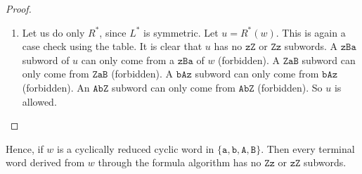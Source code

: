 \documentclass{article}
\makeatletter
\newcommand{\@addresses}{}
\newcommand{\printaddresses}{%
	\section*{}
	\@addresses
}
\makeatother
\begin{document}
\begin{proof}
\begin{enumerate}
			
			\item Let us do only $R^*$, since $L^*$ is symmetric.
			Let $u=R^*(w)$.
			This is again a case check using the table.
			It is clear that $u$ has no $\mathtt{zZ}$ or $\mathtt{Z z}$ subwords.
			A $\mathtt{zB a}$ subword of $u$ can only come from a $\mathtt{zB a}$ of $w$ (forbidden).
			A $\mathtt{Z aB}$ subword can only come from $\mathtt{Z aB}$ (forbidden).
			A $\mathtt{bA z}$ subword can only come from $\mathtt{bA z}$ (forbidden).
			An $\mathtt{A bZ}$ subword can only come from $\mathtt{A bZ}$ (forbidden).
			So $u$ is allowed. \qedhere
		\end{enumerate}
	\end{proof}
	
	Hence, if $w$ is a cyclically reduced cyclic word in $\{\mathtt{a},\mathtt{b},\mathtt{A},\mathtt{B}\}$.
	Then every terminal word derived from $w$ through the formula algorithm has no $\mathtt{Z z}$ or $\mathtt{zZ}$ subwords.
	
	
	
	
	
	
	\printaddresses
	
	
	
\end{document}
